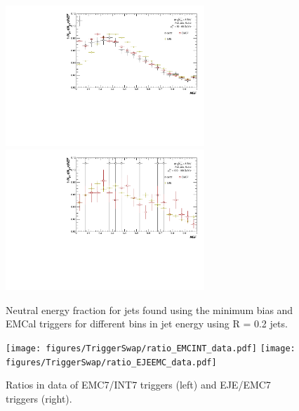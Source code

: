\documentclass[ALICE]{ALICE_analysis_notes}
\begin{document}
\begin{figure}[h!]
\begin{multicols}{2}
        \vfill\null
        \columnbreak
            \includegraphics[width=7.5cm]{figures/NEF/All/hNEF_30-60GeV_R02.pdf}
            \includegraphics[width=7.5cm]{figures/NEF/All/hNEF_100-160GeV_R02.pdf}
        \vfill\null
    \end{multicols}
    \caption{Neutral energy fraction for jets found using the minimum bias and EMCal triggers for different bins in jet energy using R = 0.2 jets.}
    \label{fig:NEF}
\end{figure}

\begin{figure}[h!]
    \centering
    \begin{multicols}{2}
            \texttt{[image: figures/TriggerSwap/ratio\_EMCINT\_data.pdf]}
        \vfill\null 
        \columnbreak
            \texttt{[image: figures/TriggerSwap/ratio\_EJEEMC\_data.pdf]}
        \vfill\null
    \end{multicols}
    \caption{Ratios in data of EMC7/INT7 triggers (left) and EJE/EMC7 triggers (right).}
    \label{fig:trigger_ratios}
\end{figure}
\end{document}
